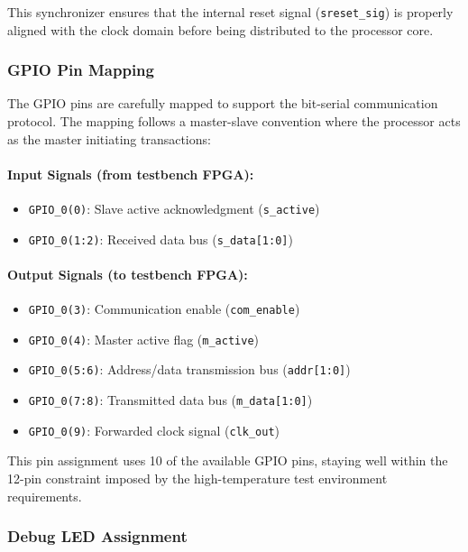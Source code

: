 \documentclass[12pt]{article}
\begin{document}
This synchronizer ensures that the internal reset signal (\texttt{sreset\_sig}) is properly aligned with the clock domain before being distributed to the processor core.

\subsubsection{GPIO Pin Mapping}

The GPIO pins are carefully mapped to support the bit-serial communication protocol. The mapping follows a master-slave convention where the processor acts as the master initiating transactions:

\paragraph{Input Signals (from testbench FPGA):}
\begin{itemize}
    \item \texttt{GPIO\_0(0)}: Slave active acknowledgment (\texttt{s\_active})
    \item \texttt{GPIO\_0(1:2)}: Received data bus (\texttt{s\_data[1:0]})
\end{itemize}

\paragraph{Output Signals (to testbench FPGA):}
\begin{itemize}
    \item \texttt{GPIO\_0(3)}: Communication enable (\texttt{com\_enable})
    \item \texttt{GPIO\_0(4)}: Master active flag (\texttt{m\_active})
    \item \texttt{GPIO\_0(5:6)}: Address/data transmission bus (\texttt{addr[1:0]})
    \item \texttt{GPIO\_0(7:8)}: Transmitted data bus (\texttt{m\_data[1:0]})
    \item \texttt{GPIO\_0(9)}: Forwarded clock signal (\texttt{clk\_out})
\end{itemize}

This pin assignment uses 10 of the available GPIO pins, staying well within the 12-pin constraint imposed by the high-temperature test environment requirements.

\subsubsection{Debug LED Assignment}
\end{document}
